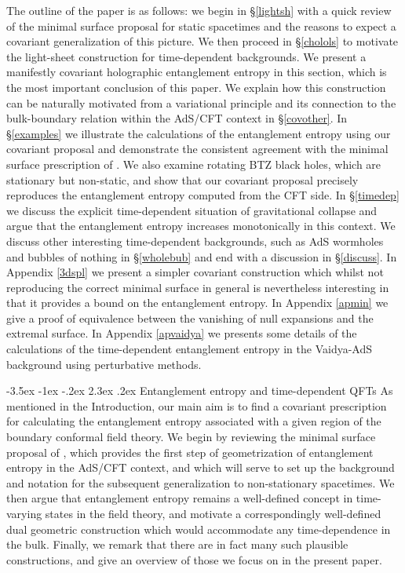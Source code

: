 \documentclass[12pt]{article}
\makeatletter
\renewcommand\section{\@startsection {section}{1}{\z@}%
                                   {-3.5ex \@plus -1ex \@minus -.2ex}%
                                   {2.3ex \@plus.2ex}%
                                   {\normalfont\large\bfseries}}
\def\sec#1{\S \;\ref{#1}}
\def\App#1{Appendix \ref{#1}}
\makeatother
\begin{document}
The outline of the paper is as follows: we begin in \sec{lightsh}
with a quick review of the minimal surface proposal for static
spacetimes and the reasons to expect a covariant generalization of
this picture. We then proceed in \sec{cholols} to motivate the
light-sheet construction for time-dependent backgrounds. We present a manifestly
covariant holographic entanglement entropy in this section, which is
the most important conclusion of this paper. We explain
how this construction can be naturally motivated from a variational
principle and its connection to the bulk-boundary relation within the
AdS/CFT context in \sec{covother}. 
In \sec{examples} we illustrate the calculations of the
entanglement entropy using our covariant proposal and demonstrate
the consistent agreement with the minimal surface prescription of
\cite{Ryu:2006bv, Ryu:2006ef}. We also examine rotating BTZ black
holes, which are stationary but non-static, and show that our
covariant proposal precisely reproduces the entanglement entropy
computed from the CFT side.  In
\sec{timedep} we discuss the explicit time-dependent situation of
gravitational collapse and argue that the entanglement entropy
increases monotonically in this context. We discuss other
interesting time-dependent backgrounds, such as AdS wormholes and
bubbles of nothing in \sec{wholebub} and end with a discussion in
\sec{discuss}. In \App{3dspl} we present a simpler covariant
construction which whilst not reproducing the correct minimal
surface in general  is nevertheless interesting in that it provides
a bound on the entanglement entropy.  In \App{apmin} we give a proof
of equivalence between the vanishing of null expansions and the
extremal surface. In \App{apvaidya} we presents some details of the
calculations of the time-dependent entanglement entropy in the
Vaidya-AdS background using perturbative methods.


\section{Entanglement entropy and time-dependent QFTs}
\label{lightsh}
 As mentioned in the Introduction, our main aim is to find a covariant
 prescription for calculating the entanglement entropy associated with a
  given region of the boundary conformal field theory. We begin by reviewing the
  minimal surface proposal of \cite{Ryu:2006bv, Ryu:2006ef}, which
  provides the first step of
   geometrization of entanglement entropy in the AdS/CFT context, and which will
   serve to set up the background and notation for the subsequent generalization
   to non-stationary spacetimes.
 We then argue that entanglement entropy remains a well-defined concept in time-varying states in the field theory, and motivate a correspondingly well-defined dual geometric construction which would accommodate any time-dependence in the bulk.  Finally, we remark that there are in fact many such plausible constructions, and give an overview of those we focus on in the present paper.
\end{document}
